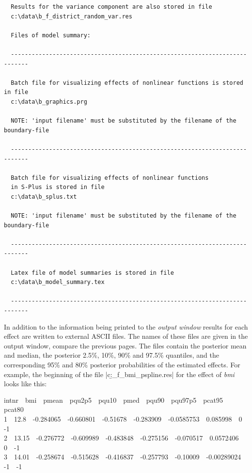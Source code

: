 \documentclass[a4paper]{article}
\begin{document}
\begin{verbatim}
  Results for the variance component are also stored in file
  c:\data\b_f_district_random_var.res

  Files of model summary:

  ---------------------------------------------------------------------------

  Batch file for visualizing effects of nonlinear functions is stored in file
  c:\data\b_graphics.prg

  NOTE: 'input filename' must be substituted by the filename of the boundary-file

  ---------------------------------------------------------------------------

  Batch file for visualizing effects of nonlinear functions
  in S-Plus is stored in file
  c:\data\b_splus.txt

  NOTE: 'input filename' must be substituted by the filename of the boundary-file

  ---------------------------------------------------------------------------

  Latex file of model summaries is stored in file
  c:\data\b_model_summary.tex

  ---------------------------------------------------------------------------
\end{verbatim}
\normalsize

In addition to the information being printed to the {\em output window} results for each effect are written to external ASCII
files. The names of these files are given in the output window, compare the previous pages. The files contain the posterior
mean and median, the posterior 2.5\%, 10\%, 90\% and 97.5\% quantiles, and the corresponding 95\% and 80\% posterior
probabilities of the estimated effects. For example, the beginning of the file |c:\data\b_f_bmi_pspline.res| for the effect of
{\em bmi} looks like this:

{\footnotesize
 intnr \,\, bmi \,\, pmean \,\, pqu2p5 \,\, pqu10 \,\, pmed \,\, pqu90 \,\, pqu97p5 \,\, pcat95 \,\, pcat80\\
 1 \,\, 12.8 \,\, -0.284065 \,\, -0.660801 \,\, -0.51678 \,\, -0.283909 \,\, -0.0585753 \,\, 0.085998 \,\, 0 \,\, -1\\
 2 \,\, 13.15 \,\, -0.276772 \,\, -0.609989 \,\, -0.483848 \,\, -0.275156 \,\, -0.070517 \,\, 0.0572406 \,\, 0 \,\, -1\\
 3 \,\, 14.01 \,\, -0.258674 \,\, -0.515628 \,\, -0.416837 \,\, -0.257793 \,\, -0.10009 \,\, -0.00289024 \,\, -1 \,\, -1}
\end{document}
